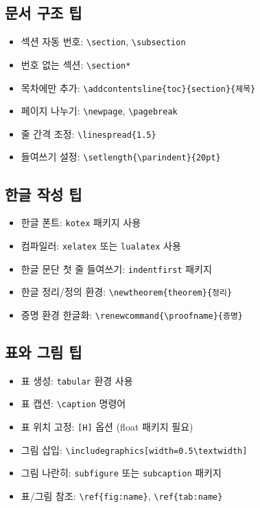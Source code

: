 \documentclass[12pt,a4paper]{article}
\begin{document}
\subsection{문서 구조 팁}
\begin{itemize}
    \item 섹션 자동 번호: \texttt{\textbackslash section}, \texttt{\textbackslash subsection}
    \item 번호 없는 섹션: \texttt{\textbackslash section*}
    \item 목차에만 추가: \texttt{\textbackslash addcontentsline\{toc\}\{section\}\{제목\}}
    \item 페이지 나누기: \texttt{\textbackslash newpage}, \texttt{\textbackslash pagebreak}
    \item 줄 간격 조정: \texttt{\textbackslash linespread\{1.5\}}
    \item 들여쓰기 설정: \texttt{\textbackslash setlength\{\textbackslash parindent\}\{20pt\}}
\end{itemize}

\subsection{한글 작성 팁}
\begin{itemize}
    \item 한글 폰트: \texttt{kotex} 패키지 사용
    \item 컴파일러: \texttt{xelatex} 또는 \texttt{lualatex} 사용
    \item 한글 문단 첫 줄 들여쓰기: \texttt{indentfirst} 패키지
    \item 한글 정리/정의 환경: \texttt{\textbackslash newtheorem\{theorem\}\{정리\}}
    \item 증명 환경 한글화: \texttt{\textbackslash renewcommand\{\textbackslash proofname\}\{증명\}}
\end{itemize}

\subsection{표와 그림 팁}
\begin{itemize}
    \item 표 생성: \texttt{tabular} 환경 사용
    \item 표 캡션: \texttt{\textbackslash caption} 명령어
    \item 표 위치 고정: \texttt{[H]} 옵션 (float 패키지 필요)
    \item 그림 삽입: \texttt{\textbackslash includegraphics[width=0.5\textbackslash textwidth]}
    \item 그림 나란히: \texttt{subfigure} 또는 \texttt{subcaption} 패키지
    \item 표/그림 참조: \texttt{\textbackslash ref\{fig:name\}}, \texttt{\textbackslash ref\{tab:name\}}
\end{itemize}
\end{document}
